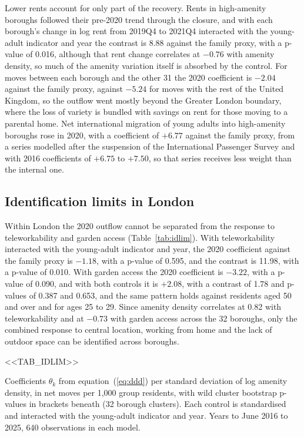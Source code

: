 \documentclass[11pt,a4paper]{article}
\newcommand{\tabnote}[1]{\par\smallskip\parbox{\linewidth}{\footnotesize #1}}
\begin{document}
Lower rents account for only part of the recovery. Rents in high-amenity boroughs followed their pre-2020 trend through the closure, and with each borough's change in log rent from 2019Q4 to 2021Q4 interacted with the young-adult indicator and year the contrast is 8.88 against the family proxy, with a p-value of 0.016, although that rent change correlates at $-0.76$ with amenity density, so much of the amenity variation itself is absorbed by the control. For moves between each borough and the other 31 the 2020 coefficient is $-2.04$ against the family proxy, against $-5.24$ for moves with the rest of the United Kingdom, so the outflow went mostly beyond the Greater London boundary, where the loss of variety is bundled with savings on rent for those moving to a parental home. Net international migration of young adults into high-amenity boroughs rose in 2020, with a coefficient of $+6.77$ against the family proxy, from a series modelled after the suspension of the International Passenger Survey and with 2016 coefficients of $+6.75$ to $+7.50$, so that series receives less weight than the internal one.

\subsection{Identification limits in London}\label{sec:idlim}

Within London the 2020 outflow cannot be separated from the response to teleworkability and garden access (Table~\ref{tab:idlim}). With teleworkability interacted with the young-adult indicator and year, the 2020 coefficient against the family proxy is $-1.18$, with a p-value of 0.595, and the contrast is 11.98, with a p-value of 0.010. With garden access the 2020 coefficient is $-3.22$, with a p-value of 0.090, and with both controls it is $+2.08$, with a contrast of 1.78 and p-values of 0.387 and 0.653, and the same pattern holds against residents aged 50 and over and for ages 25 to 29. Since amenity density correlates at 0.82 with teleworkability and at $-0.73$ with garden access across the 32 boroughs, only the combined response to central location, working from home and the lack of outdoor space can be identified across boroughs.

\begin{table}[htbp]
\centering
\caption{Teleworkability and garden access controls, London triple difference}\label{tab:idlim}
\small
<<TAB_IDLIM>>
\tabnote{Coefficients $\theta_k$ from equation~(\ref{eq:ddd}) per standard deviation of log amenity density, in net moves per 1,000 group residents, with wild cluster bootstrap p-values in brackets beneath (32 borough clusters). Each control is standardised and interacted with the young-adult indicator and year. Years to June 2016 to 2025, 640 observations in each model.}
\end{table}
\end{document}
